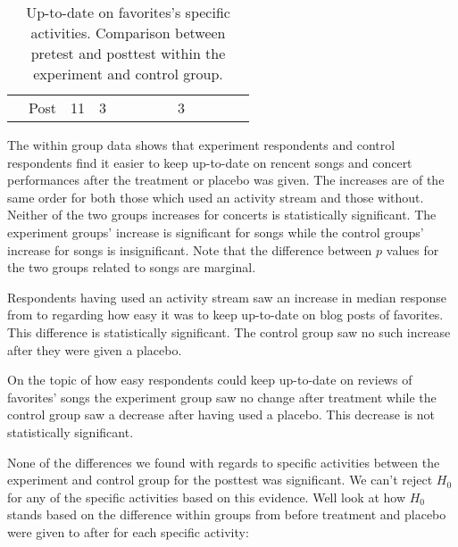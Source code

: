 \begin{table}
\begin{whole}
\begin{tabular}{rrrrccclrrrrl}
        &
        Post &
        11 &
        3 &
        &
        &
        &
        &
        3 \\

  \end{tabular}
  \caption[Up-to-date on Favorites' Specific Activities, Within Groups]{%
    Up-to-date on favorites's specific activities. Comparison between
    pretest and posttest within the experiment and control group.
  }
  \label{table:uptodate.favorite.specific.activities.within}
  \end{whole}
\end{table}

The within group data shows that experiment respondents and control
respondents find it easier to keep up-to-date on rencent songs
and concert performances after the treatment or placebo was given.
The increases are of the same order for both those which used an
activity stream and those without. Neither of the two groups increases
for concerts is statistically significant.
The experiment groups' increase is significant for songs while the control
groups' increase for songs is insignificant.
Note that the difference between $p$ values for the two groups related to
songs are marginal.

Respondents having used an activity stream saw an increase in median
response from  to  regarding
how easy it was to keep up-to-date on blog posts of favorites.
This difference is statistically significant.
The control group saw no such increase after they were given a placebo.

On the topic of how easy respondents could keep up-to-date on
reviews of favorites' songs the experiment group saw no change
after treatment while the control group saw a decrease after having used
a placebo. This decrease is not statistically significant.

\parabreak

None of the differences we found with regards to specific activities between
the experiment and control group for the posttest was significant.
We can't reject $H_0$ for any of the specific activities based on this
evidence. Well look at how $H_0$ stands based on the difference within groups
from before treatment and placebo were given to after for each specific
activity:

